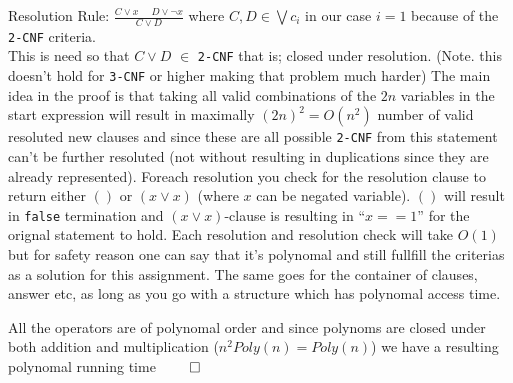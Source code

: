 \documentclass[a4paper,twoside=false,abstract=false,numbers=noenddot,
titlepage=false,headings=small,parskip=half,version=last]{scrartcl}
\begin{document}
Resolution Rule: $\frac{C \vee x \ \ \ \ \ \ D \vee \neg x}{C \vee D}$ where $C,D \in \bigvee{c_{i}}$ in our case $i=1$ because of the \verb+2-CNF+ criteria. \\
This is need so that $C \vee D$ $\in$ \verb+2-CNF+ that is; closed under resolution. (Note. this doesn't hold for \verb+3-CNF+ or higher making that problem much harder)
The main idea in the proof is that taking all valid combinations of the $2n$ variables in the start expression will result in maximally $(2n)^2=O(n^2)$ number of valid resoluted new clauses 
and since these are all possible \verb+2-CNF+ from this statement can't be further resoluted (not without resulting in duplications since they are already represented).
Foreach resolution you check for the resolution clause to return either $()$ or $(x \vee x)$ (where $x$ can be negated variable). 
$()$ will result in \verb+false+ termination and $(x \vee x)$-clause is resulting in ``$x==1$'' for the orignal statement to hold. 
Each resolution and resolution check will take $O(1)$ but for safety reason one can say that it's polynomal and still fullfill the criterias as a solution for this assignment.
The same goes for the container of clauses, answer etc, as long as you go with a structure which has polynomal access time.

All the operators are of polynomal order and since polynoms are closed under both addition and multiplication ($n^{2}Poly(n)=Poly(n)$) we have a resulting polynomal running time $\qed$

\end{document}
